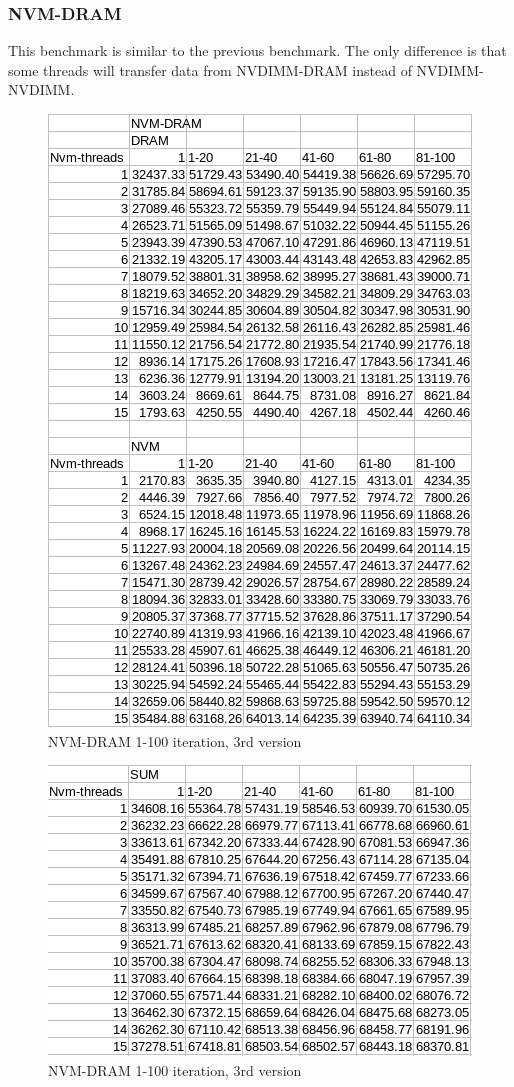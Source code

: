 \documentclass[12pt,a4paper,USenglish]{article}      %
\begin{document}
\subsubsection{NVM-DRAM}
This benchmark is similar to the previous benchmark. The only difference is that some threads will transfer data from NVDIMM-DRAM instead of NVDIMM-NVDIMM.
\begin{figure}[!hbtp]
\includegraphics[scale=0.7]{NVM-DRAM_table_p1_1-100_v3}
\caption{NVM-DRAM 1-100 iteration, 3rd version}
\end{figure}

\begin{figure}[!hbtp]
\includegraphics[scale=0.7]{NVM-DRAM_table_p2_1-100_v3}
\caption{NVM-DRAM 1-100 iteration, 3rd version}
\end{figure}
\end{document}
